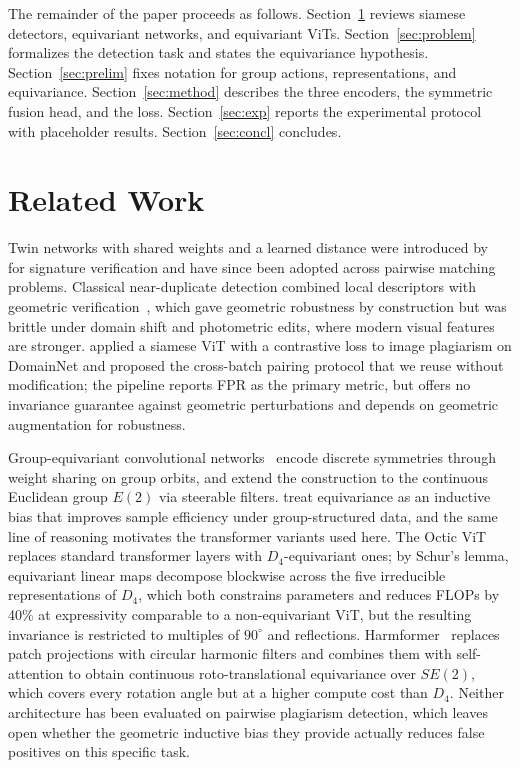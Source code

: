 \documentclass{article}
\begin{document}
The remainder of the paper proceeds as follows. Section~\ref{sec:rw} reviews siamese detectors, equivariant networks, and equivariant ViTs. Section~\ref{sec:problem} formalizes the detection task and states the equivariance hypothesis. Section~\ref{sec:prelim} fixes notation for group actions, representations, and equivariance. Section~\ref{sec:method} describes the three encoders, the symmetric fusion head, and the loss. Section~\ref{sec:exp} reports the experimental protocol with placeholder results. Section~\ref{sec:concl} concludes.

\section{Related Work}\label{sec:rw}

Twin networks with shared weights and a learned distance were introduced by~\citet{bromley1993signature} for signature verification and have since been adopted across pairwise matching problems. Classical near-duplicate detection combined local descriptors with geometric verification~\citep{ke2004efficient}, which gave geometric robustness by construction but was brittle under domain shift and photometric edits, where modern visual features are stronger. \citet{dorin2024pairwise} applied a siamese ViT with a contrastive loss to image plagiarism on DomainNet and proposed the cross-batch pairing protocol that we reuse without modification; the pipeline reports FPR as the primary metric, but offers no invariance guarantee against geometric perturbations and depends on geometric augmentation for robustness.

Group-equivariant convolutional networks~\citep{cohen2016group} encode discrete symmetries through weight sharing on group orbits, and \citet{weiler2019general} extend the construction to the continuous Euclidean group $E(2)$ via steerable filters. \citet{bronstein2021geometric} treat equivariance as an inductive bias that improves sample efficiency under group-structured data, and the same line of reasoning motivates the transformer variants used here. The Octic ViT~\citep{nordstrom2025octic} replaces standard transformer layers with $D_4$-equivariant ones; by Schur's lemma, equivariant linear maps decompose blockwise across the five irreducible representations of $D_4$, which both constrains parameters and reduces FLOPs by 40\% at expressivity comparable to a non-equivariant ViT, but the resulting invariance is restricted to multiples of $90^\circ$ and reflections. Harmformer~\citep{karella2024harmformer} replaces patch projections with circular harmonic filters and combines them with self-attention to obtain continuous roto-translational equivariance over $SE(2)$, which covers every rotation angle but at a higher compute cost than $D_4$. Neither architecture has been evaluated on pairwise plagiarism detection, which leaves open whether the geometric inductive bias they provide actually reduces false positives on this specific task.
\end{document}

